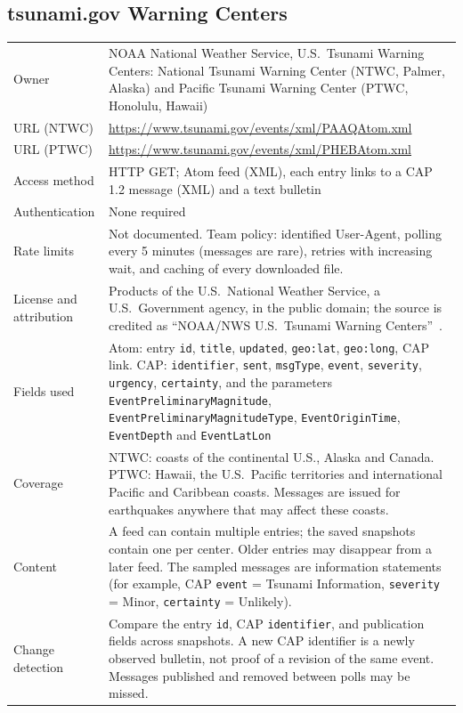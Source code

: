 \documentclass[a4paper,11pt,oneside]{book}
\begin{document}
\subsection{tsunami.gov Warning Centers}
\noindent\begin{tabularx}{\textwidth}{@{}lX@{}}
\toprule
Owner & NOAA National Weather Service, U.S.\ Tsunami Warning Centers: National Tsunami Warning Center (NTWC, Palmer, Alaska) and Pacific Tsunami Warning Center (PTWC, Honolulu, Hawaii) \\
URL (NTWC) & \url{https://www.tsunami.gov/events/xml/PAAQAtom.xml} \\
URL (PTWC) & \url{https://www.tsunami.gov/events/xml/PHEBAtom.xml} \\
Access method & HTTP GET; Atom feed (XML), each entry links to a CAP 1.2 message (XML) and a text bulletin \\
Authentication & None required \\
Rate limits & Not documented. Team policy: identified User-Agent, polling every 5 minutes (messages are rare), retries with increasing wait, and caching of every downloaded file. \\
License and attribution & Products of the U.S.\ National Weather Service, a U.S.\ Government agency, in the public domain; the source is credited as ``NOAA/NWS U.S.\ Tsunami Warning Centers''~\cite{tsunamigov}. \\
Fields used & Atom: entry \texttt{id}, \texttt{title}, \texttt{updated}, \texttt{geo:lat}, \texttt{geo:long}, CAP link. CAP: \texttt{identifier}, \texttt{sent}, \texttt{msgType}, \texttt{event}, \texttt{severity}, \texttt{urgency}, \texttt{certainty}, and the parameters \texttt{EventPreliminaryMagnitude}, \texttt{EventPreliminaryMagnitudeType}, \texttt{EventOriginTime}, \texttt{EventDepth} and \texttt{EventLatLon} \\
Coverage & NTWC: coasts of the continental U.S., Alaska and Canada. PTWC: Hawaii, the U.S.\ Pacific territories and international Pacific and Caribbean coasts. Messages are issued for earthquakes anywhere that may affect these coasts. \\
Content & A feed can contain multiple entries; the saved snapshots contain one per center. Older entries may disappear from a later feed. The sampled messages are information statements (for example, CAP \texttt{event} = Tsunami Information, \texttt{severity} = Minor, \texttt{certainty} = Unlikely). \\
Change detection & Compare the entry \texttt{id}, CAP \texttt{identifier}, and publication fields across snapshots. A new CAP identifier is a newly observed bulletin, not proof of a revision of the same event. Messages published and removed between polls may be missed. \\
\bottomrule
\end{tabularx}
\end{document}
